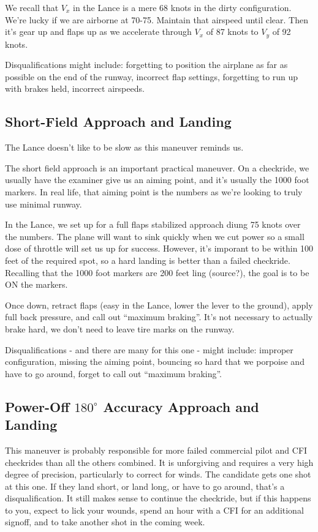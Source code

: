 We recall that $V_x$ in the Lance is a mere 68 knots in the dirty configuration. We're lucky if we are airborne at 70-75. Maintain that airspeed until clear. Then it's gear up and flaps up as we accelerate through $V_x$ of 87 knots to $V_y$ of 92 knots.

Disqualifications might include: forgetting to position the airplane as far as possible on the end of the runway, incorrect flap settings, forgetting to run up with brakes held, incorrect airspeeds.

\subsection{Short-Field Approach and Landing}

The Lance doesn't like to be slow as this maneuver reminds us.

The short field approach is an important practical maneuver. On a checkride, we usually have the examiner give us an aiming point, and it's usually the 1000 foot markers. In real life, that aiming point is the numbers as we're looking to truly use minimal runway.

In the Lance, we set up for a full flaps stabilized approach diung 75 knots over the numbers. The plane will want to sink quickly when we cut power so a small dose of throttle will set us up for success. However, it's imporant to be within 100 feet of the required spot, so a hard landing is better than a failed checkride. Recalling that the 1000 foot markers are 200 feet ling (source?), the goal is to be ON the markers.

Once down, retract flaps (easy in the Lance, lower the lever to the ground), apply full back pressure, and call out ``maximum braking''. It's not necessary to actually brake hard, we don't need to leave tire marks on the runway.

Disqualifications - and there are many for this one - might include: improper configuration, missing the aiming point, bouncing so hard that we porpoise and have to go around, forget to call out ``maximum braking''.

\subsection{Power-Off $180^\circ$ Accuracy Approach and Landing}

This maneuver is probably responsible for more failed commercial pilot and CFI checkrides than all the others combined. It is unforgiving and requires a very high degree of precision, particularly to correct for winds. The candidate gets one shot at this one. If they land short, or land long, or have to go around, that's a disqualification. It still makes sense to continue the checkride, but if this happens to you, expect to lick your wounds, spend an hour with a CFI for an additional signoff, and to take another shot in the coming week.


